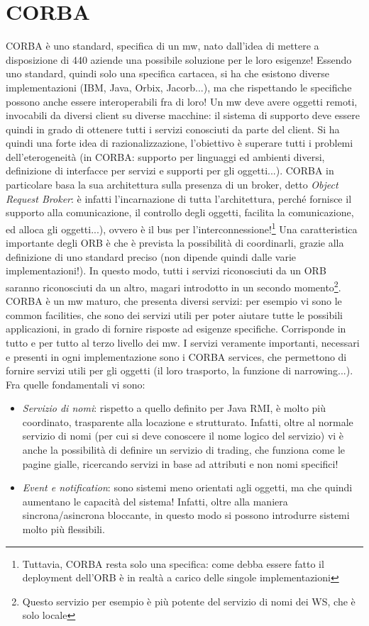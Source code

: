 \section{CORBA}
CORBA è uno standard, specifica di un mw, nato dall'idea di mettere a disposizione di 440 aziende una possibile
soluzione per le loro esigenze!
Essendo uno standard, quindi solo una specifica cartacea, si ha che esistono diverse implementazioni (IBM, Java, Orbix,
Jacorb...), ma che rispettando le specifiche possono anche essere interoperabili fra di loro!
Un mw deve avere oggetti remoti, invocabili da diversi client su diverse macchine: il sistema di supporto deve essere
quindi in grado di ottenere tutti i servizi conosciuti da parte del client. Si ha quindi una forte idea di
razionalizzazione, l'obiettivo è superare tutti i problemi dell'eterogeneità (in CORBA: supporto per linguaggi ed
ambienti diversi, definizione di interfacce per servizi e supporti per gli oggetti...).
CORBA in particolare basa la sua architettura sulla presenza di un broker, detto \textit{Object Request Broker}: è
infatti l'incarnazione di tutta l'architettura, perché fornisce il supporto alla comunicazione, il controllo degli
oggetti, facilita la comunicazione, ed alloca gli oggetti...), ovvero è il bus per
l'interconnessione!\footnote{Tuttavia, CORBA resta solo una specifica: come debba essere fatto il deployment
dell'ORB è in realtà a carico delle singole implementazioni} Una caratteristica importante degli ORB è che è prevista la
possibilità di coordinarli, grazie alla definizione di uno standard preciso (non dipende quindi dalle varie
implementazioni!). In questo modo, tutti i servizi riconosciuti da un ORB saranno riconosciuti da un altro, magari
introdotto in un secondo momento\footnote{Questo servizio per esempio è più potente del servizio di nomi dei WS, che è
solo locale}.
CORBA è un mw maturo, che presenta diversi servizi: per esempio vi sono le common facilities, che sono dei servizi utili
per poter aiutare tutte le possibili applicazioni, in grado di fornire risposte ad esigenze specifiche. Corrisponde in
tutto e per tutto al terzo livello dei mw.
I servizi veramente importanti, necessari e presenti in ogni implementazione sono i CORBA services, che
permettono di fornire servizi utili per gli oggetti (il loro trasporto, la funzione di narrowing...).
Fra quelle fondamentali vi sono:
\begin{itemize}
 \item \textit{Servizio di nomi}: rispetto a quello definito per Java RMI, è molto più coordinato, trasparente alla locazione e strutturato. Infatti, oltre al normale servizio di nomi (per cui si deve conoscere il nome logico del servizio) vi
 è  anche la possibilità di definire un servizio di trading, che funziona come le pagine gialle, ricercando servizi in base ad attributi e non nomi specifici!
 \item \textit{Event e notification}: sono sistemi meno orientati agli oggetti, ma che quindi aumentano le capacità del
 sistema! Infatti, oltre alla maniera sincrona/asincrona bloccante, in questo modo si possono introdurre sistemi
 molto più flessibili.
\end{itemize}

